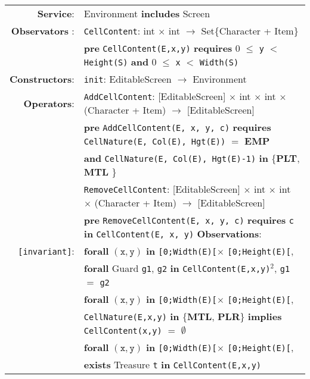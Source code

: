 \documentclass[8pt]{article}
\begin{document}
{\small
\begin{longtable}{rl}
  \textbf{Service}: & Environment \textbf{includes} Screen
  \\ \textbf{Observators} : & \texttt{CellContent}:
  \textrm{int} $\times$ \textrm{int} $\rightarrow$
  \textrm{Set\{Character + Item\}} \\
  & \quad \textbf{pre } \texttt{CellContent(E,x,y)} \textbf{ requires } 0 $\leq$ \texttt{y} $<$ \texttt{Height(S)} \textbf{ and } 0 $\leq$ \texttt{x} $<$ \texttt{Width(S)}\\
  \textbf{Constructors}: & \texttt{init}: \textrm{EditableScreen} $\rightarrow$ \textrm{Environment} \\
  \textbf{Operators}: & \texttt{AddCellContent}: \textrm{[EditableScreen]} $\times$ \textrm{int} $\times$ \textrm{int} $\times$ \textrm{(Character + Item)} $\rightarrow$ \textrm{[EditableScreen]}\\
  & \quad \textbf{pre} \texttt{AddCellContent(E, x, y, c)} \textbf{requires} \texttt{CellNature(E, Col(E), Hgt(E))} $=$ \textbf{EMP} \\ 
  & \quad\quad\quad \textbf{and} \texttt{CellNature(E, Col(E), Hgt(E)-1)} \textbf{in} \{\textbf{PLT}, \textbf{MTL}  \} \\
  & \texttt{RemoveCellContent}: \textrm{[EditableScreen]} $\times$ \textrm{int} $\times$ \textrm{int} $\times$ \textrm{(Character + Item)} $\rightarrow$ \textrm{[EditableScreen]} \\
  & \quad \textbf{pre} \texttt{RemoveCellContent(E, x, y, c)} \textbf{requires} \texttt{c} \textbf{in} \texttt{CellContent(E, x, y)}
  \textbf{Observations}: \\
  \texttt{[invariant]}: & \textbf{forall} $(\mathtt{x},\mathtt{y})$ \textbf{in} \texttt{[0;Width(E)[}$\times$ \texttt{[0;Height(E)[}, \\
  & \quad\quad \textbf{forall} \textrm{Guard} \texttt{g1}, \texttt{g2} \textbf{in} \texttt{CellContent(E,x,y)}$^2$, \texttt{g1} $=$ \texttt{g2} \\
  & \textbf{forall} $(\mathtt{x},\mathtt{y})$ \textbf{in} \texttt{[0;Width(E)[}$\times$ \texttt{[0;Height(E)[},~\\
  & \quad\quad \texttt{CellNature(E,x,y)} \textbf{in} \{\textbf{MTL}, \textbf{PLR}\} \textbf{implies} \texttt{CellContent(x,y)} $=$ $\emptyset$  \\
  & \textbf{forall} $(\mathtt{x},\mathtt{y})$ \textbf{in} \texttt{[0;Width(E)[}$\times$ \texttt{[0;Height(E)[},~\\ & \quad\quad \textbf{exists} \textrm{Treasure} \texttt{t} \textbf{in} \texttt{CellContent(E,x,y)}  \\

\end{longtable}}
\end{document}
